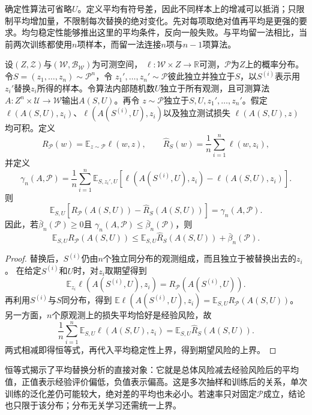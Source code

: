 确定性算法可省略$U$。定义平均有符号差，因此不同样本上的增减可以抵消；只限制平均增加量，不限制每次替换的绝对变化。先对每项取绝对值再平均是更强的要求。均匀稳定性能够推出这里的平均条件，反向一般失败。与平均留一法相比，当前两次训练都使用$n$项样本，而留一法连接$n$项与$n-1$项算法。

\begin{theorem}[平均稳定性与期望风险]
\label{thm:on-average-generalization}
设$(Z,\mathcal Z)$与$(\mathcal W,\mathcal B_{\mathcal W})$为可测空间，
$\ell:\mathcal W\times Z\to\mathbb R$可测，$\mathcal P$为$Z$上的概率分布。
令$S=(z_1,\ldots,z_n)\sim\mathcal P^n$，令
$z_1',\ldots,z_n'\sim\mathcal P$彼此独立并独立于$S$，以$S^{(i)}$表示用
$z_i'$替换$z_i$所得的样本。令算法内部随机数$U$独立于所有观测，且可测算法
$A:Z^n\times\mathcal U\to\mathcal W$输出$A(S,U)$。再令
$z\sim\mathcal P$独立于$S,U,z_1',\ldots,z_n'$。假定
$\ell(A(S,U),z_i)$、$\ell(A(S^{(i)},U),z_i)$以及独立测试损失
$\ell(A(S,U),z)$均可积。定义
\[
 R_{\mathcal P}(w)=\mathbb E_{z\sim\mathcal P}\ell(w,z),
 \qquad
 \hat R_S(w)=\frac1n\sum_{i=1}^n\ell(w,z_i),
\]
并定义
\[
 \gamma_n(A,\mathcal P)
 =\frac1n\sum_{i=1}^n\mathbb E_{S,z_i',U}
 \left[\ell(A(S^{(i)},U),z_i)-\ell(A(S,U),z_i)\right].
\]
则
\begin{equation}
 \mathbb E_{S,U}\left[R_{\mathcal P}(A(S,U))-\hat R_S(A(S,U))\right]
 =\gamma_n(A,\mathcal P).
 \label{eq:on-average-generalization-identity}
\end{equation}
因此，若$\bar\beta_n(\mathcal P)\geq0$且
$\gamma_n(A,\mathcal P)\leq\bar\beta_n(\mathcal P)$，则
\[
 \mathbb E_{S,U}R_{\mathcal P}(A(S,U))
 \leq\mathbb E_{S,U}\hat R_S(A(S,U))+\bar\beta_n(\mathcal P).
\]
\end{theorem}
\begin{proof}
替换后，$S^{(i)}$仍由$n$个独立同分布的观测组成，而且独立于被替换出去的$z_i$。
在给定$S^{(i)}$和$U$时，对$z_i$取期望得到
\[
 \mathbb E_{z_i}\ell(A(S^{(i)},U),z_i)
 =R_{\mathcal P}(A(S^{(i)},U)).
\]
再利用$S^{(i)}$与$S$同分布，得到
$\mathbb E\ell(A(S^{(i)},U),z_i)=\mathbb E_{S,U}R_{\mathcal P}(A(S,U))$。
另一方面，$n$个原观测上的损失平均恰好是经验风险，故
\[
 \frac1n\sum_{i=1}^n\mathbb E_{S,U}\ell(A(S,U),z_i)
 =\mathbb E_{S,U}\hat R_S(A(S,U)).
\]
两式相减即得恒等式，再代入平均稳定性上界，得到期望风险的上界。
\end{proof}

恒等式揭示了平均替换分析的直接对象：它就是总体风险减去经验风险后的平均值，正值表示经验评价偏低，负值表示偏高。这是多次抽样和训练后的关系，单次训练的泛化差仍可能较大，绝对差的平均也未必小。若速率只对固定$\mathcal P$成立，结论也只限于该分布；分布无关学习还需统一上界。

